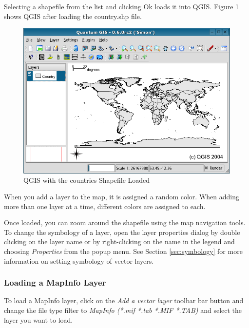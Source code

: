 \documentclass[10pt,english]{article}
\newcommand\qgistip[1]{\raggedright\small{#1}}
\begin{document}
\begin{onehalfspace}
\begin{figure}[h]
\end{figure}
Selecting a shapefile from the list and clicking Ok loads it into QGIS. Figure \ref{fig:loadedshapefile}
shows QGIS after loading the country.shp file.
\begin{figure}[h]
   \begin{center}
   \caption{QGIS with the countries Shapefile Loaded}\label{fig:loadedshapefile}\smallskip
   \includegraphics[scale=.6]{qgis_user_guide_images/shapefileloaded}
\end{center}  
   
\end{figure}
\begin{Tip}\caption{\textsc{Layer Colors}}
\qgistip{When you add a layer to the map, it is assigned a random color. When adding more than one layer at a time, different colors are assigned to each. }
\end{Tip}

Once loaded, you can zoom around the shapefile using the map navigation tools. To change the symbology of a layer, open the layer properties dialog by double clicking on the layer name or by right-clicking on the name in the legend and choosing \textsl{Properties} from the popup menu. See Section \ref{sec:symbology} for more information on setting symbology of vector layers.
\subsubsection{Loading a MapInfo Layer}
To load a MapInfo layer, click on the \textit{Add a vector layer}
toolbar bar button and change the file type filter to \textit{MapInfo (*.mif
*.tab *.MIF *.TAB)} and select the layer you want to load.


\end{onehalfspace}
\end{document}
